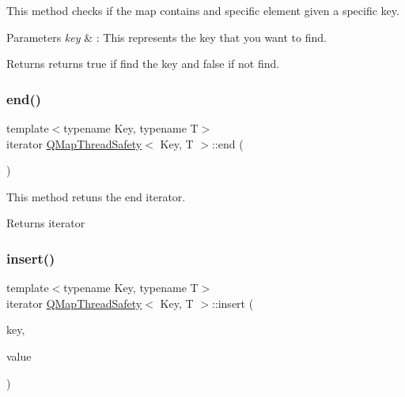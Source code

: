 This method checks if the map contains and specific element given a specific key. 


\begin{DoxyParams}{Parameters}
{\em key} & \+: This represents the key that you want to find. \\
\hline
\end{DoxyParams}
\begin{DoxyReturn}{Returns}
returns true if find the key and false if not find. 
\end{DoxyReturn}
\mbox{\label{class_q_map_thread_safety_a64a700a04a692176f00e119500dd1b23}} 
\subsubsection{\texorpdfstring{end()}{end()}}
{\footnotesize\ttfamily template$<$typename Key, typename T$>$ \\
iterator \mbox{\hyperlink{class_q_map_thread_safety}{Q\+Map\+Thread\+Safety}}$<$ Key, T $>$\+::end (\begin{DoxyParamCaption}{ }\end{DoxyParamCaption})\hspace{0.3cm}{\ttfamily [inline]}}



This method retuns the end iterator. 

\begin{DoxyReturn}{Returns}
iterator 
\end{DoxyReturn}
\mbox{\label{class_q_map_thread_safety_a156afe871591b26ce155da6ce6409ad6}} 
\subsubsection{\texorpdfstring{insert()}{insert()}}
{\footnotesize\ttfamily template$<$typename Key, typename T$>$ \\
iterator \mbox{\hyperlink{class_q_map_thread_safety}{Q\+Map\+Thread\+Safety}}$<$ Key, T $>$\+::insert (\begin{DoxyParamCaption}\item[{const Key \&}]{key,  }\item[{const T \&}]{value }\end{DoxyParamCaption})\hspace{0.3cm}{\ttfamily [inline]}}



